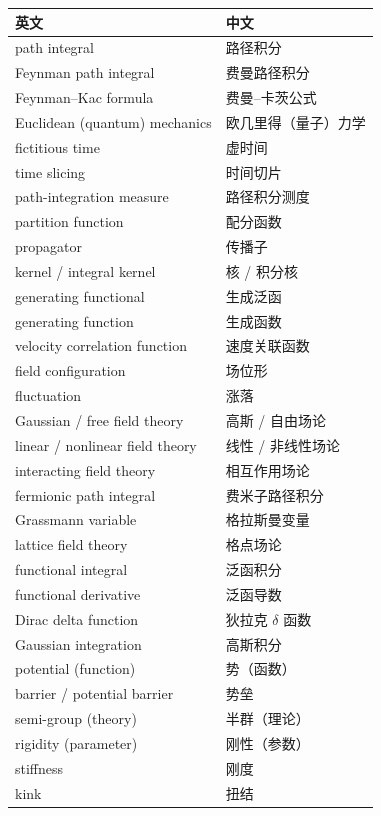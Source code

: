 \begin{center}
\begin{tabular}{@{}L{6.4cm}L{7.4cm}@{}}
\toprule
英文 & 中文 \\
\midrule
path integral & 路径积分 \\
Feynman path integral & 费曼路径积分 \\
Feynman--Kac formula & 费曼--卡茨公式 \\
Euclidean (quantum) mechanics & 欧几里得（量子）力学 \\
fictitious time & 虚时间 \\
time slicing & 时间切片 \\
path-integration measure & 路径积分测度 \\
partition function & 配分函数 \\
propagator & 传播子 \\
kernel / integral kernel & 核 / 积分核 \\
generating functional & 生成泛函 \\
generating function & 生成函数 \\
velocity correlation function & 速度关联函数 \\
field configuration & 场位形 \\
fluctuation & 涨落 \\
Gaussian / free field theory & 高斯 / 自由场论 \\
linear / nonlinear field theory & 线性 / 非线性场论 \\
interacting field theory & 相互作用场论 \\
fermionic path integral & 费米子路径积分 \\
Grassmann variable & 格拉斯曼变量 \\
lattice field theory & 格点场论 \\
functional integral & 泛函积分 \\
functional derivative & 泛函导数 \\
Dirac delta function & 狄拉克 $\delta$ 函数 \\
Gaussian integration & 高斯积分 \\
potential (function) & 势（函数） \\
barrier / potential barrier & 势垒 \\
semi-group (theory) & 半群（理论） \\
rigidity (parameter) & 刚性（参数） \\
stiffness & 刚度 \\
kink & 扭结 \\
\bottomrule
\end{tabular}
\end{center}
